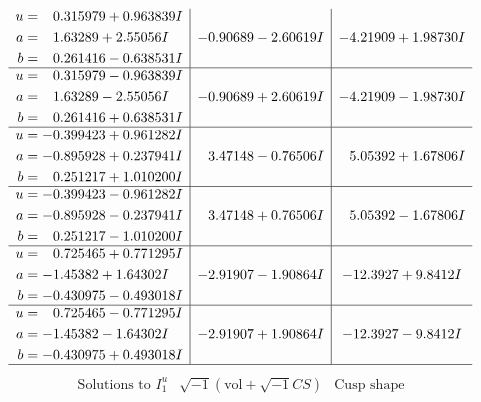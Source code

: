\documentclass[1p]{elsarticle_modified}
\theoremstyle{definition}
\newcommand{\I}{\sqrt{-1}}
\begin{document}
$$\begin{array}{c|c|c}
\begin{aligned}
u &= \phantom{-}0.315979 + 0.963839 I \\
a &= \phantom{-}1.63289 + 2.55056 I \\
b &= \phantom{-}0.261416 - 0.638531 I\end{aligned}
 & -0.90689 - 2.60619 I & -4.21909 + 1.98730 I \\ \hline\begin{aligned}
u &= \phantom{-}0.315979 - 0.963839 I \\
a &= \phantom{-}1.63289 - 2.55056 I \\
b &= \phantom{-}0.261416 + 0.638531 I\end{aligned}
 & -0.90689 + 2.60619 I & -4.21909 - 1.98730 I \\ \hline\begin{aligned}
u &= -0.399423 + 0.961282 I \\
a &= -0.895928 + 0.237941 I \\
b &= \phantom{-}0.251217 + 1.010200 I\end{aligned}
 & \phantom{-}3.47148 - 0.76506 I & \phantom{-}5.05392 + 1.67806 I \\ \hline\begin{aligned}
u &= -0.399423 - 0.961282 I \\
a &= -0.895928 - 0.237941 I \\
b &= \phantom{-}0.251217 - 1.010200 I\end{aligned}
 & \phantom{-}3.47148 + 0.76506 I & \phantom{-}5.05392 - 1.67806 I \\ \hline\begin{aligned}
u &= \phantom{-}0.725465 + 0.771295 I \\
a &= -1.45382 + 1.64302 I \\
b &= -0.430975 - 0.493018 I\end{aligned}
 & -2.91907 - 1.90864 I & -12.3927 + 9.8412 I \\ \hline\begin{aligned}
u &= \phantom{-}0.725465 - 0.771295 I \\
a &= -1.45382 - 1.64302 I \\
b &= -0.430975 + 0.493018 I\end{aligned}
 & -2.91907 + 1.90864 I & -12.3927 - 9.8412 I\\
 \hline 
 \end{array}$$\newpage$$\begin{array}{c|c|c}  
\text{Solutions to }I^u_{1}& \I (\text{vol} + \sqrt{-1}CS) & \text{Cusp shape}\\
 \hline 
\begin{aligned}

\end{aligned}
\end{array}$$
\end{document}
